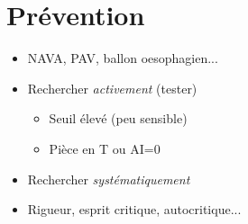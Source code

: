 \section{Prévention}
\begin{frame}
	\begin{itemize}
		\item NAVA, PAV, ballon oesophagien...
		\item Rechercher {\em activement} (tester)
			\begin{itemize}
				\item Seuil élevé (peu sensible)
				\item Pièce en T ou AI=0
			\end{itemize}
		\item Rechercher {\em systématiquement}
		\item Rigueur, esprit critique, autocritique...  
	\end{itemize}
\end{frame}
